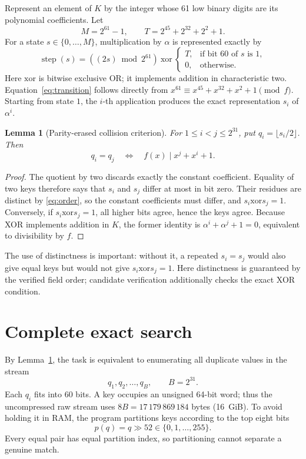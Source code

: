 \documentclass[11pt,a4paper]{article}
\newtheorem{lemma}[theorem]{Lemma}
\newcommand{\xor}{\mathbin{\mathrm{xor}}}
\begin{document}
Represent an element of \(K\) by the integer whose 61 low binary digits
are its polynomial coefficients. Let
\[
 M=2^{61}-1,\qquad
 T=2^{45}+2^{32}+2^2+1.
\]
For a state \(s\in\{0,\ldots,M\}\), multiplication by \(\alpha\)
is represented exactly by
\begin{equation}\label{eq:transition}
 \operatorname{step}(s)=
 ((2s)\bmod 2^{61})\ \xor\
 \begin{cases}T,&\text{if bit 60 of }s\text{ is 1},\\0,&\text{otherwise}.\end{cases}
\end{equation}
Here \(\xor\) is bitwise exclusive OR; it implements addition in
characteristic two. Equation~\eqref{eq:transition} follows directly from
\(x^{61}\equiv x^{45}+x^{32}+x^2+1\pmod f\).
Starting from state \(1\), the \(i\)-th application produces the exact
representation \(s_i\) of \(\alpha^i\).

\begin{lemma}[Parity-erased collision criterion]\label{lem:collision}
For \(1\le i<j\le 2^{31}\), put \(q_i=\lfloor s_i/2\rfloor\).
Then
\begin{equation}\label{eq:equiv}
 q_i=q_j \quad\Longleftrightarrow\quad
 f(x)\mid x^j+x^i+1.
\end{equation}
\end{lemma}
\begin{proof}
The quotient by two discards exactly the constant coefficient. Equality
of two keys therefore says that \(s_i\) and \(s_j\) differ at most in
bit zero. Their residues are distinct by \eqref{eq:order}, so the constant
coefficients must differ, and \(s_i\xor s_j=1\). Conversely, if
\(s_i\xor s_j=1\), all higher bits agree, hence the keys agree.
Because XOR implements addition in \(K\), the former identity is
\(\alpha^i+\alpha^j+1=0\), equivalent to divisibility by \(f\).
\end{proof}

The use of distinctness is important: without it, a repeated \(s_i=s_j\)
would also give equal keys but would not give \(s_i\xor s_j=1\).
Here distinctness is guaranteed by the verified field order; candidate
verification additionally checks the exact XOR condition.

\section{Complete exact search}\label{sec:algorithm}
By Lemma~\ref{lem:collision}, the task is equivalent to enumerating all
duplicate values in the stream
\begin{equation}\label{eq:stream}
 q_1,q_2,\ldots,q_B,\qquad B=2^{31}.
\end{equation}
Each \(q_i\) fits into 60 bits. A key occupies an unsigned 64-bit word;
thus the uncompressed raw stream uses
\(8B=17\,179\,869\,184\) bytes (16~GiB). To avoid holding it in RAM,
the program partitions keys according to the top eight bits
\[
 p(q)=q\gg52\in\{0,1,\ldots,255\}.
\]
Every equal pair has equal partition index, so partitioning cannot
separate a genuine match.
\end{document}

